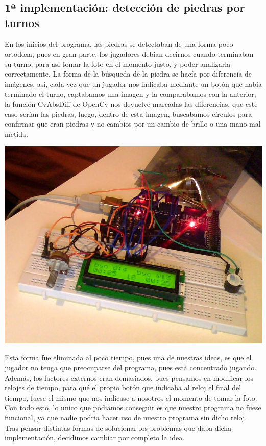 \documentclass[12pt,a4papert,woside,openright,titlepage,final]{book}
\begin{document}
\subsection{1ª implementación: detección de piedras por turnos}

En los inicios del programa, las piedras se detectaban de una forma poco
ortodoxa, pues en gran parte, los jugadores debían decirnos cuando terminaban su
turno, para asi tomar la foto en el momento justo, y poder analizarla
correctamente. La forma de la búsqueda de la piedra se hacía por diferencia de
imágenes, asi, cada vez que un jugador nos indicaba mediante un botón que habia
terminado el turno, captabamos una imagen y la comparabamos con la anterior, la
función CvAbsDiff de OpenCv nos devuelve marcadas las diferencias, que este caso
serían las piedras, luego, dentro de esta imagen, buscabamos círculos para
confirmar que eran piedras y no cambios por un cambio de brillo o una mano mal
metida.

\includegraphics[scale=0.4]{reloj.jpg}

Esta forma fue eliminada al poco tiempo, pues una de nuestras ideas, es que el
jugador no tenga que preocuparse del programa, pues está concentrado jugando.
Además, los factores externos eran demasiados, pues pensamos en modificar los
relojes de tiempo, para qué el propio botón que indicaba al reloj el final del
tiempo, fuese el mismo que nos indicase a nosotros el momento de tomar la foto.
Con todo esto, lo unico que podiamos conseguir es que nuestro programa no fuese
funcional, ya que nadie podria hacer uso de nuestro programa sin dicho reloj.
Tras pensar distintas formas de solucionar los problemas que daba dicha
implementación, decidimos cambiar por completo la idea.  
\end{document}
